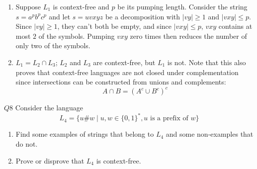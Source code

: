 \documentclass{article}
\theoremstyle{definition}
\theoremstyle{definition}
\theoremstyle{remark}
\begin{document}
\begin{enumerate}
    \item[$(ii)$] Suppose $L_1$ is context-free and $p$ be its pumping length. Consider the string $s=a^pb^pc^p$ and let $s=uvxyz$ be a decomposition with $|vy|\geq1$ and $|vxy|\leq p$. Since $|vy|\geq1$, they can't both be empty, and since $|vxy|\leq p$, $vxy$ contains at most $2$ of the symbols. Pumping $vxy$ zero times then reduces the number of only two of the symbols.

    \item[$(iii)$] $L_1=L_2\cap L_3$; $L_2$ and $L_3$ are context-free, but $L_1$ is not. Note that this also proves that context-free languages are not closed under complementation since intersections can be constructed from unions and complements:
    \begin{equation*}
        A\cap B=(A^c\cup B^c)^c
    \end{equation*}
\end{enumerate}











\begin{questionbox}{$Q8$}
    Consider the language
    \begin{equation*}
        L_4=\bigl\{u\#w\mid u,w\in\{0,1\}^\ast,u\text{ is a prefix of }w\bigr\}
    \end{equation*}
    \begin{enumerate}
        \item[$(i)$] Find some examples of strings that belong to $L_4$ and some non-examples that do not.
        
        \item[$(ii)$] Prove or disprove that $L_4$ is context-free.
    \end{enumerate}
\end{questionbox}

\bigskip
\end{document}
